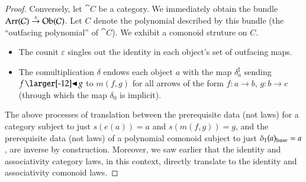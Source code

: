 \documentclass{amsart}
\begin{document}
\begin{proof}
  Conversely, let $\cat{C}$ be a category. We immediately obtain the
  bundle ${\operatorname{Arr}(\mathcal{C})\overset{s}{\to}\operatorname{Ob}(\mathcal{C})}$. Let $C$ denote
  the polynomial described by this bundle (the ``outfacing polynomial''
  of $\cat{C}$). We exhibit a comonoid struture on $C$.
  \begin{itemize}
  \item The counit $\varepsilon$ singles out the identity in each
    object's set of outfacing maps.
  \item The comultiplication $\delta$ endows each object $a$ with the
    map $\delta^\sharp_a$ sending $f \subd g$ to $m(f, g)$ for all
    arrows of the form $f: a \to b$, $g: b \to c$ (through which the
    map $\delta_0$ is implicit).
  \end{itemize}

  The above processes of translation between the prerequisite data
  (not laws) for a category subject to just $s(e(a)) = a$ and
  $s(m(f, g)) = g$, and the prerequisite data (not laws) of a
  polynomial comonoid subject to just
  ${\delta}_1(a)_{\mathrm{base}} = a$, are inverse by
  construction. Moreover, we saw earlier that the identity and
  associativity category laws, in this context, directly translate
  to the identity and associativity comonoid laws.
\end{proof}
\end{document}
